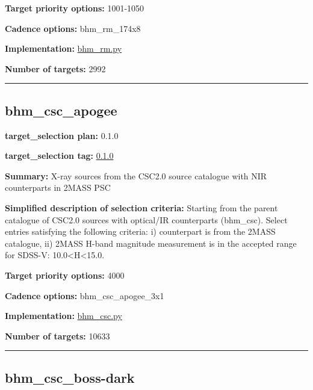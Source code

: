 \noindent\textbf{Target priority options:} 1001-1050

\noindent\textbf{Cadence options:} bhm\_rm\_174x8

\noindent\textbf{Implementation:}
\href{https://github.com/sdss/target_selection/blob/0.1.0/python/target_selection/cartons/bhm_rm.py}{bhm\_rm.py}

\noindent\textbf{Number of targets:} 2992

\begin{center}\rule{0.5\linewidth}{0.5pt}\end{center}

\hypertarget{bhm_csc_apogee_plan0.1.0}{%
\subsection{bhm\_csc\_apogee}\label{bhm_csc_apogee_plan0.1.0}}

\noindent\textbf{target\_selection plan:} 0.1.0

\noindent\textbf{target\_selection tag:}
\href{https://github.com/sdss/target_selection/tree/0.1.0/}{0.1.0}

\noindent\textbf{Summary:} X-ray sources from the CSC2.0 source catalogue with
NIR counterparts in 2MASS PSC

\noindent\textbf{Simplified description of selection criteria:} Starting from the
parent catalogue of CSC2.0 sources with optical/IR counterparts
(bhm\_csc). Select entries satisfying the following criteria: i)
counterpart is from the 2MASS catalogue, ii) 2MASS H-band magnitude
measurement is in the accepted range for SDSS-V:
10.0\textless H\textless15.0.


\noindent\textbf{Target priority options:} 4000

\noindent\textbf{Cadence options:} bhm\_csc\_apogee\_3x1

\noindent\textbf{Implementation:}
\href{https://github.com/sdss/target_selection/blob/0.1.0/python/target_selection/cartons/bhm_csc.py}{bhm\_csc.py}

\noindent\textbf{Number of targets:} 10633

\begin{center}\rule{0.5\linewidth}{0.5pt}\end{center}

\hypertarget{bhm_csc_boss-dark_plan0.1.0}{%
\subsection{bhm\_csc\_boss-dark}\label{bhm_csc_boss-dark_plan0.1.0}}

